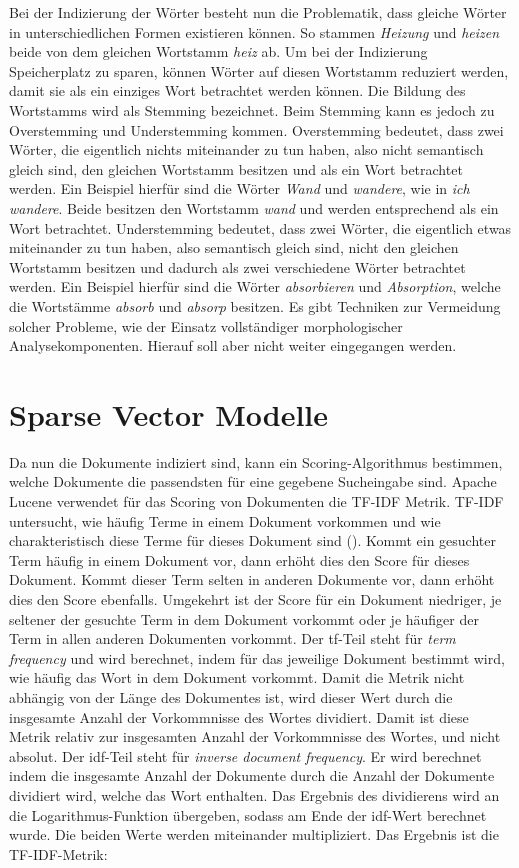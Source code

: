 Bei der Indizierung der Wörter besteht nun die Problematik, dass gleiche Wörter in unterschiedlichen Formen existieren können.
So stammen \textit{Heizung} und \textit{heizen} beide von dem gleichen Wortstamm \textit{heiz} ab.
Um bei der Indizierung Speicherplatz zu sparen, können Wörter auf diesen Wortstamm reduziert werden, damit sie als ein einziges Wort betrachtet werden können.
Die Bildung des Wortstamms wird als Stemming bezeichnet.
Beim Stemming kann es jedoch zu Overstemming und Understemming kommen.
Overstemming bedeutet, dass zwei Wörter, die eigentlich nichts miteinander zu tun haben, also nicht semantisch gleich sind, den gleichen Wortstamm besitzen und als ein Wort betrachtet werden.
Ein Beispiel hierfür sind die Wörter \textit{Wand} und \textit{wandere}, wie in \textit{ich wandere}.
Beide besitzen den Wortstamm \textit{wand} und werden entsprechend als ein Wort betrachtet.
Understemming bedeutet, dass zwei Wörter, die eigentlich etwas miteinander zu tun haben, also semantisch gleich sind, nicht den gleichen Wortstamm besitzen und dadurch als zwei verschiedene Wörter betrachtet werden.
Ein Beispiel hierfür sind die Wörter \textit{absorbieren} und \textit{Absorption}, welche die Wortstämme \textit{absorb} und \textit{absorp} besitzen.
Es gibt Techniken zur Vermeidung solcher Probleme, wie der Einsatz vollständiger morphologischer Analysekomponenten.
Hierauf soll aber nicht weiter eingegangen werden.\\

\section{Sparse Vector Modelle}
\label{chap:sparse-vector-models}
Da nun die Dokumente indiziert sind, kann ein Scoring-Algorithmus bestimmen, welche Dokumente die passendsten für eine gegebene Sucheingabe sind.
Apache Lucene verwendet für das Scoring von Dokumenten die TF-IDF Metrik.
TF-IDF untersucht, wie häufig Terme in einem Dokument vorkommen und wie charakteristisch diese Terme für dieses Dokument sind (\cite{Manning_Raghavan_Schuetze_2019}).
Kommt ein gesuchter Term häufig in einem Dokument vor, dann erhöht dies den Score für dieses Dokument.
Kommt dieser Term selten in anderen Dokumente vor, dann erhöht dies den Score ebenfalls.
Umgekehrt ist der Score für ein Dokument niedriger, je seltener der gesuchte Term in dem Dokument vorkommt oder je häufiger der Term in allen anderen Dokumenten vorkommt.
Der tf-Teil steht für \textit{term frequency} und wird berechnet, indem für das jeweilige Dokument bestimmt wird, wie häufig das Wort in dem Dokument vorkommt.
Damit die Metrik nicht abhängig von der Länge des Dokumentes ist, wird dieser Wert durch die insgesamte Anzahl der Vorkommnisse des Wortes dividiert.
Damit ist diese Metrik relativ zur insgesamten Anzahl der Vorkommnisse des Wortes, und nicht absolut.
Der idf-Teil steht für \textit{inverse document frequency}.
Er wird berechnet indem die insgesamte Anzahl der Dokumente durch die Anzahl der Dokumente dividiert wird, welche das Wort enthalten.
Das Ergebnis des dividierens wird an die Logarithmus-Funktion übergeben, sodass am Ende der idf-Wert berechnet wurde.
Die beiden Werte werden miteinander multipliziert.
Das Ergebnis ist die TF-IDF-Metrik:

